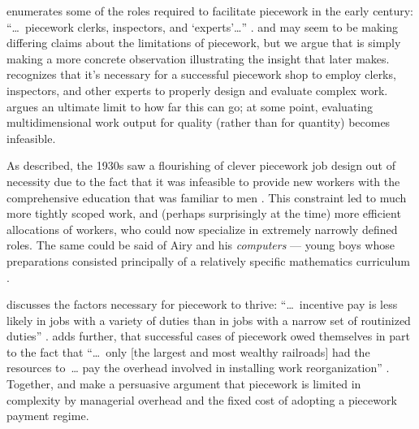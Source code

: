 \documentclass[trackingWork]{subfiles}
\begin{document}
\citeauthor{10.2307/23702539} enumerates some of the roles required
to facilitate piecework in the early  century:
    ``\dots~piecework clerks, inspectors, and `experts'\dots''
\cite{hart2016rise,10.2307/23702539}.
\citeauthor{10.2307/23702539} and \citeauthor{hart2016rise} may seem
to be making differing claims about the limitations of piecework, but
we argue that \citeauthor{10.2307/23702539}
is simply making a more concrete observation illustrating the insight that
\citeauthor{hart2016rise} later makes.
\citeauthor{10.2307/23702539} recognizes that
it's necessary for a successful piecework shop to employ
clerks,
inspectors, and
other experts to properly design and evaluate complex work.
\citeauthor{hart2016rise} argues an ultimate limit to how far this can go;
at some point, evaluating multidimensional work output for quality
(rather than for quantity) becomes infeasible.

As \citeauthor{hart2013rise} described,
the 1930s saw a flourishing of clever piecework job design out of necessity
due to the fact that it was infeasible to provide new workers with
the comprehensive education that was familiar to men
\cite{hart2013rise}.
This constraint led to much more tightly scoped work, and
(perhaps surprisingly at the time) more efficient allocations of workers,
who could now specialize in extremely narrowly defined roles.
The same could be said of Airy and his \textit{computers}
--- young boys whose preparations consisted principally of
a relatively specific mathematics curriculum
\cite{grier2013computers}.



\citeauthor{Brown01041990} discusses the factors necessary for piecework to thrive:
    ``\dots~incentive pay is less likely in jobs with
    a variety of duties than in jobs with a narrow set of routinized duties''
\cite{Brown01041990}.
\citeauthor{10.2307/23702539} adds further, that
successful cases of piecework owed themselves in part to the fact that
    ``\dots~only [the largest and most wealthy railroads] had the resources to~\dots
    pay the overhead involved in installing work reorganization''
\cite{10.2307/23702539}.
Together, \citeauthor{10.2307/23702539} and \citeauthor{Brown01041990}
make a persuasive argument that piecework is limited in complexity by
managerial overhead and the fixed cost of adopting a piecework payment regime.
\end{document}
